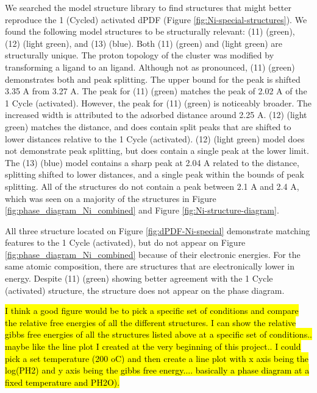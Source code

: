 \documentclass[journal=jctcce,manuscript=article]{achemso}
\begin{document}
We searched the model structure library to find structures that might better reproduce the 1 (Cycled) activated dPDF (Figure \ref{fig:Ni-special-structures}). We found the following model structures to be structurally relevant: (11)  (green), (12)  (light green), and (13)  (blue). Both (11)  (green) and  (light green) are structurally unique. The proton topology of the cluster was modified by transforming a  ligand to an  ligand. 
Although not as pronounced, (11)  (green) demonstrates both  and  peak splitting. The upper bound for the  peak is shifted 3.35 A from 3.27 A. The  peak for (11)  (green) matches the peak of 2.02 A of the 1 Cycle (activated). However, the  peak for (11)  (green) is noticeably broader. The increased width is attributed to the adsorbed  distance around 2.25 A. (12)  (light green) matches the  distance, and does contain split  peaks that are shifted to lower distances relative to the 1 Cycle (activated). (12)  (light green) model does not demonstrate  peak splitting, but does contain a single peak at the lower  limit. The (13)  (blue) model contains a sharp peak at 2.04 A related to the  distance,  splitting shifted to lower distances, and a single  peak within the bounds of  peak splitting. All of the structures do not contain a  peak between 2.1 A and 2.4 A, which was seen on a majority of the structures in Figure \ref{fig:phase_diagram_Ni_combined} and Figure \ref{fig:Ni-structure-diagram}. 

All three structure located on Figure \ref{fig:dPDF-Ni-special} demonstrate matching features to the 1 Cycle (activated), but do not appear on Figure \ref{fig:phase_diagram_Ni_combined} because of their electronic energies. For the same atomic composition, there are structures that are electronically lower in energy. Despite (11)  (green) showing better agreement with the 1 Cycle (activated) structure, the structure does not appear on the phase diagram. 

\hl{I think a good figure would be to pick a specific set of conditions and compare the relative free energies of all the different structures. I can show the relative gibbs free energies of all the structures listed above at a specific set of conditions.. maybe like the line plot I created at the very beginning of this project.. I could pick a set temperature (200 oC) and then create a line plot with x axis being the log(PH2) and y axis being the gibbs free energy.... basically a phase diagram at a fixed temperature and PH2O).}
\end{document}
